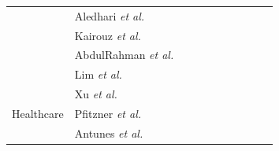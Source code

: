 \documentclass[journal]{IEEEtran}
\newcommand{\cmark}{\ding{51}}
\newcommand{\xmark}{\ding{55}}
\begin{document}
\begin{table}[t]
\begin{tabular}{|l|l|lllll|lll|}
                       & Aledhari \textit{et al.}~\cite{aledhari2020federated} & \multicolumn{1}{c|}{\cmark} & \multicolumn{1}{c|}{\cmark} & \multicolumn{1}{c|}{\xmark} & \multicolumn{1}{c|}{\xmark} & \multicolumn{1}{c|}{\xmark} & \multicolumn{1}{c|}{\cmark} & \multicolumn{1}{c|}{\cmark} & \multicolumn{1}{c|}{\cmark} \\ \cline{2-10} 
                       &   Kairouz \textit{et al.}~\cite{kairouz2021advances}          & \multicolumn{1}{c|}{\cmark} & \multicolumn{1}{c|}{\cmark} & \multicolumn{1}{c|}{\cmark} & \multicolumn{1}{c|}{\cmark} & \multicolumn{1}{c|}{\cmark} & \multicolumn{1}{c|}{\cmark} & \multicolumn{1}{c|}{\cmark} & \multicolumn{1}{c|}{\cmark} \\ \cline{2-10} 
                       & AbdulRahman \textit{et al.}~\cite{abdulrahman2020survey} & \multicolumn{1}{c|}{\cmark} & \multicolumn{1}{c|}{\cmark} & \multicolumn{1}{c|}{\cmark} & \multicolumn{1}{c|}{\cmark} & \multicolumn{1}{c|}{\xmark} & \multicolumn{1}{c|}{\cmark} & \multicolumn{1}{c|}{\cmark} & \multicolumn{1}{c|}{\cmark} \\ \cline{2-10} 
                       &    Lim \textit{et al.}~\cite{lim2020federated}       & \multicolumn{1}{c|}{\cmark} & \multicolumn{1}{c|}{\cmark} & \multicolumn{1}{c|}{\cmark} & \multicolumn{1}{c|}{\cmark} & \multicolumn{1}{c|}{\xmark} & \multicolumn{1}{c|}{\cmark} & \multicolumn{1}{c|}{\cmark} & \multicolumn{1}{c|}{\cmark} \\ \hline
    \multirow{4}{*}{Healthcare}  &   Xu \textit{et al.}~\cite{xu2021federated}             & \multicolumn{1}{c|}{\cmark} & \multicolumn{1}{c|}{\cmark} & \multicolumn{1}{c|}{\cmark} & \multicolumn{1}{c|}{\xmark} & \multicolumn{1}{c|}{\xmark} & \multicolumn{1}{c|}{\cmark} & \multicolumn{1}{c|}{\cmark} & \multicolumn{1}{c|}{\cmark} \\ \cline{2-10} 
                       & Pfitzner \textit{et al.}\cite{pfitzner2021federated}                  & \multicolumn{1}{c|}{\cmark} & \multicolumn{1}{c|}{\cmark} & \multicolumn{1}{c|}{\cmark} & \multicolumn{1}{c|}{\xmark} & \multicolumn{1}{c|}{\xmark} & \multicolumn{1}{c|}{\cmark} & \multicolumn{1}{c|}{\cmark} & \multicolumn{1}{c|}{\cmark} \\ \cline{2-10} 
                       &           Antunes \textit{et al.}~\cite{antunes2022federated}             & \multicolumn{1}{c|}{\xmark} & \multicolumn{1}{c|}{\cmark} & \multicolumn{1}{c|}{\cmark} & \multicolumn{1}{c|}{\xmark} & \multicolumn{1}{c|}{\xmark} & \multicolumn{1}{c|}{\xmark} & \multicolumn{1}{c|}{\cmark} & \multicolumn{1}{c|}{\cmark} \\ \cline{2-10} 

\end{tabular}
\end{table}
\end{document}

